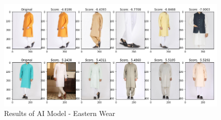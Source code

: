 \begin{figure}[H]
\includegraphics[width=12cm]{images/Recommendations4.PNG} 
\centering
\caption{Results of AI Model - Eastern Wear}
\label{architecture}
\end{figure}
